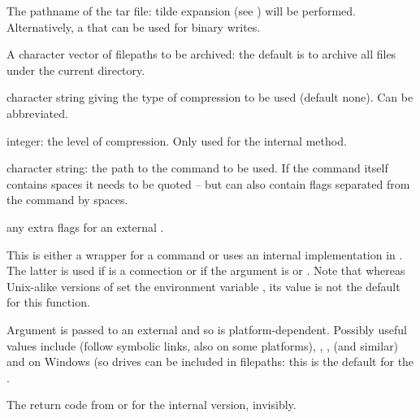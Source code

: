 %
\begin{Arguments}
\begin{ldescription}
\item[\code{tarfile}] The pathname of the tar file: tilde expansion (see
) will be performed.  Alternatively, a
 that can be used for binary writes.

\item[\code{files}] A character vector of filepaths to be archived:
the default is to archive all files under the current directory.

\item[\code{compression}] character string giving the type of compression to
be used (default none).  Can be abbreviated.

\item[\code{compression\_level}] integer: the level of compression.  Only used
for the internal method.

\item[\code{tar}] character string: the path to the command to be used.  If
the command itself contains spaces it needs to be quoted -- but
 can also contain flags separated from the command by
spaces.

\item[\code{extra\_flags}] any extra flags for an external .
\end{ldescription}
\end{Arguments}
%
\begin{Details}\relax
This is either a wrapper for a  command or uses an
internal implementation in \R{}.  The latter is used if 
is a connection or if the argument  is  or
.  Note that whereas Unix-alike versions of \R{} set the
environment variable , its value is not the default for this
function.

Argument  is passed to an external  and
so is platform-dependent.  Possibly useful values include 
(follow symbolic links, also  on some platforms),
, ,  (and
similar) and on Windows  (so drives can be
included in filepaths: this is the default for the 
.
\end{Details}
%
\begin{Value}
The return code from  or  for the internal
version, invisibly.
\end{Value}

